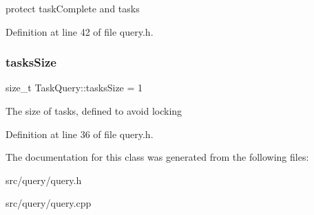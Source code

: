protect task\+Complete and tasks 

Definition at line 42 of file query.\+h.

\mbox{\label{class_task_query_a712ef51749dfd08ecdf6a33acaf6da4f}} 
\subsubsection{\texorpdfstring{tasks\+Size}{tasksSize}}
{\footnotesize\ttfamily size\+\_\+t Task\+Query\+::tasks\+Size = 1\hspace{0.3cm}{\ttfamily [protected]}}

The size of tasks, defined to avoid locking 

Definition at line 36 of file query.\+h.



The documentation for this class was generated from the following files\+:\begin{DoxyCompactItemize}
\item 
src/query/query.\+h\item 
src/query/query.\+cpp\end{DoxyCompactItemize}
